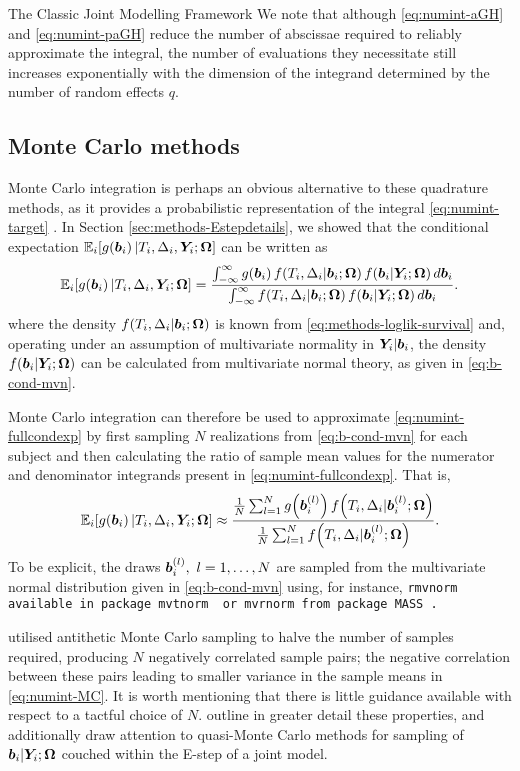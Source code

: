 \begin{chapter}{\label{cha:methods-classic}The Classic Joint Modelling Framework}
We note that although \eqref{eq:numint-aGH} and \eqref{eq:numint-paGH} reduce the number of abscissae required to reliably approximate the integral, the number of evaluations they necessitate still increases exponentially with the dimension of the integrand determined by the number of random effects $q$.

\subsection{Monte Carlo methods}\label{sec:numint-MC}
Monte Carlo integration is perhaps an obvious alternative to these quadrature methods, as it provides a probabilistic representation of the integral \eqref{eq:numint-target} \citep{Lemieux2009}. In Section \ref{sec:methods-Estepdetails}, we showed that the conditional expectation $\mathbb{E}_i\!\left[ g\!\left(\bm{b}_i\right)|T_i, \Delta_i, \bm{Y}_i; \bm{\mathrm{\Omega}}\right]$ can be written as
\begin{align}
    \mathbb{E}_i\!\left[ g\!\left(\bm{b}_i\right)|T_i, \Delta_i, \bm{Y}_i; \bm{\mathrm{\Omega}}\right]=\frac{\int_{-\infty}^\infty g\!\left(\bm{b}_i\right) f\!\left( T_i,\Delta_i|\bm{b}_i;\bm{\mathrm{\Omega}}\right) f\!\left(\bm{b}_i|\bm{Y}_i;\bm{\mathrm{\Omega}}\right) d\bm{b}_i}{\int_{-\infty}^\infty f\!\left( T_i,\Delta_i|\bm{b}_i;\bm{\mathrm{\Omega}}\right) f\!\left(\bm{b}_i|\bm{Y}_i;\bm{\mathrm{\Omega}}\right) d\bm{b}_i}.
\label{eq:numint-fullcondexp}
\end{align}
where the density $f\!\left( T_i,\Delta_i|\bm{b}_i;\bm{\mathrm{\Omega}}\right)$ is known from \eqref{eq:methods-loglik-survival} and, operating under an assumption of multivariate normality in $\bm{Y}_i|\bm{b}_i$, the density $f\!\left(\bm{b}_i|\bm{Y}_i;\bm{\mathrm{\Omega}}\right)$ can be calculated from multivariate normal theory, as given in \eqref{eq:b-cond-mvn}. 

Monte Carlo integration can therefore be used to approximate \eqref{eq:numint-fullcondexp} by first sampling $N$ realizations from \eqref{eq:b-cond-mvn} for each subject and then calculating the ratio of sample mean values for the numerator and denominator integrands present in \eqref{eq:numint-fullcondexp}. That is,
\begin{align}
    \mathbb{E}_i\!\left[ g\!\left(\bm{b}_i\right)|T_i, \Delta_i, \bm{Y}_i; \bm{\mathrm{\Omega}}\right]\approx\frac{\frac{1}{N}\sum_{l=1}^N g\!\left(\bm{b}_i^{(l)}\right) f\!\left( T_i,\Delta_i|\bm{b}_i^{(l)};\bm{\mathrm{\Omega}}\right)}{\frac{1}{N}\sum_{l=1}^Nf\!\left( T_i,\Delta_i|\bm{b}_i^{(l)};\bm{\mathrm{\Omega}}\right)}.
\label{eq:numint-MC}
\end{align}
To be explicit, the draws $\bm{b}_i^{(l)},\ l = 1,\dots,N$ are sampled from the multivariate normal distribution given in \eqref{eq:b-cond-mvn} using, for instance, \tt{rmvnorm} available in package \tt{mvtnorm} \citep{R-mvtnorm} or \tt{mvrnorm} from package \tt{MASS} \citep{R-MASS}. 

\citet{Henderson2000} utilised antithetic Monte Carlo sampling to halve the number of samples required, producing $N$ negatively correlated sample pairs; the negative correlation between these pairs leading to smaller variance in the sample means in \eqref{eq:numint-MC}. It is worth mentioning that there is little guidance available with respect to a tactful choice of $N$. \citet{Philipson2020} outline in greater detail these properties, and additionally draw attention to quasi-Monte Carlo methods for sampling of $\bm{b}_i|\bm{Y}_i;\bm{\mathrm{\Omega}}$ couched within the E-step of a joint model. 


\end{chapter}
